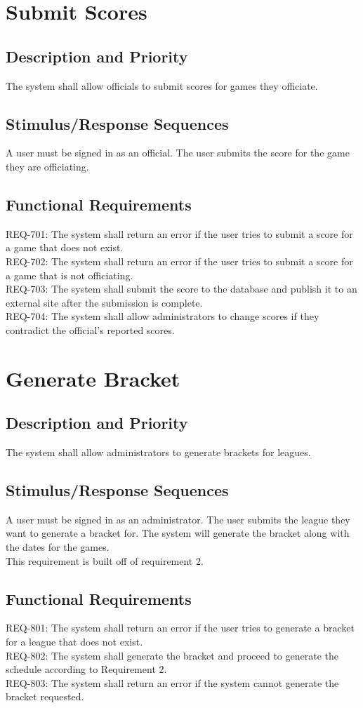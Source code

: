 \documentclass{scrreprt}
\begin{document}
\section{Submit Scores}
    \subsection{Description and Priority}
    The system shall allow officials to submit scores for games they officiate.
    \subsection{Stimulus/Response Sequences}
    A user must be signed in as an official. The user submits the score for the game they are officiating.
    \subsection{Functional Requirements}
    REQ-701: The system shall return an error if the user tries to submit a score for a game that does not exist. \\
    REQ-702: The system shall return an error if the user tries to submit a score for a game that is not officiating. \\
    REQ-703: The system shall submit the score to the database and publish it to an external site after the submission is complete. \\
    REQ-704: The system shall allow administrators to change scores if they contradict the official's reported scores.

    
    \section{Generate Bracket}
    \subsection{Description and Priority}
    The system shall allow administrators to generate brackets for leagues.
    \subsection{Stimulus/Response Sequences}
    A user must be signed in as an administrator. The user submits the league they want to generate a bracket for. The system will generate the bracket along with the dates for the games. \\
    This requirement is built off of requirement 2.
    \subsection{Functional Requirements}
    REQ-801: The system shall return an error if the user tries to generate a bracket for a league that does not exist. \\
    REQ-802: The system shall generate the bracket and proceed to generate the schedule according to Requirement 2. \\
    REQ-803: The system shall return an error if the system cannot generate the bracket requested. \\
    
\end{document}
